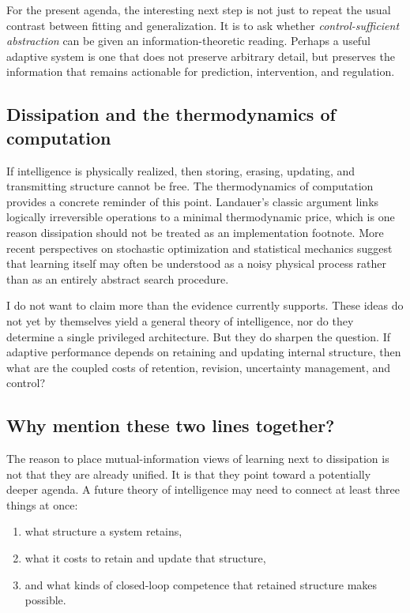 \documentclass[11pt]{article}
\begin{document}
For the present agenda, the interesting next step is not just to repeat the usual contrast between fitting and generalization. It is to ask whether \textit{control-sufficient abstraction} can be given an information-theoretic reading. Perhaps a useful adaptive system is one that does not preserve arbitrary detail, but preserves the information that remains actionable for prediction, intervention, and regulation.

\subsection{Dissipation and the thermodynamics of computation}

If intelligence is physically realized, then storing, erasing, updating, and transmitting structure cannot be free. The thermodynamics of computation provides a concrete reminder of this point. Landauer's classic argument links logically irreversible operations to a minimal thermodynamic price, which is one reason dissipation should not be treated as an implementation footnote. More recent perspectives on stochastic optimization and statistical mechanics suggest that learning itself may often be understood as a noisy physical process rather than as an entirely abstract search procedure.

I do not want to claim more than the evidence currently supports. These ideas do not yet by themselves yield a general theory of intelligence, nor do they determine a single privileged architecture. But they do sharpen the question. If adaptive performance depends on retaining and updating internal structure, then what are the coupled costs of retention, revision, uncertainty management, and control?

\subsection{Why mention these two lines together?}

The reason to place mutual-information views of learning next to dissipation is not that they are already unified. It is that they point toward a potentially deeper agenda. A future theory of intelligence may need to connect at least three things at once:

\begin{enumerate}
\item what structure a system retains,
\item what it costs to retain and update that structure,
\item and what kinds of closed-loop competence that retained structure makes possible.
\end{enumerate}
\end{document}
